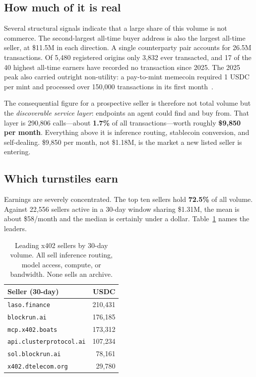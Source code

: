\documentclass[10pt,letterpaper,twocolumn]{article}
\newcommand{\code}[1]{\texttt{#1}}
\begin{document}
\subsection{How much of it is real}

Several structural signals indicate that a large share of this volume is not
commerce. The second-largest all-time buyer address is also the largest
all-time seller, at \$11.5M in each direction. A single counterparty pair
accounts for 26.5M transactions. Of 5{,}480 registered origins only 3{,}832
ever transacted, and 17 of the 40 highest all-time earners have recorded no
transaction since 2025. The 2025 peak also carried outright non-utility: a
pay-to-mint memecoin required 1 USDC per mint and processed over 150{,}000
transactions in its first month~\citep{chainalysis2026}.

The consequential figure for a prospective seller is therefore not total
volume but the \emph{discoverable service layer}: endpoints an agent could
find and buy from. That layer is 290{,}806 calls---about \textbf{1.7\%} of all
transactions---worth roughly \textbf{\$9{,}850 per month}. Everything above it
is inference routing, stablecoin conversion, and self-dealing. \$9{,}850 per
month, not \$1.18M, is the market a new listed seller is entering.

\subsection{Which turnstiles earn}

Earnings are severely concentrated. The top ten sellers hold \textbf{72.5\%}
of all volume. Against 22{,}556 sellers active in a 30-day window sharing
\$1.31M, the mean is about \$58/month and the median is certainly under a
dollar. Table~\ref{tab:sellers} names the leaders.

\begin{table}[t]
\centering
\footnotesize
\begin{tabularx}{\columnwidth}{@{}Xr@{}}
\toprule
\textbf{Seller (30-day)} & \textbf{USDC} \\
\midrule
\code{laso.finance} & 210{,}431 \\
\code{blockrun.ai} & 176{,}185 \\
\code{mcp.x402.boats} & 173{,}312 \\
\code{api.clusterprotocol.ai} & 107{,}234 \\
\code{sol.blockrun.ai} & 78{,}161 \\
\code{x402.dtelecom.org} & 29{,}780 \\
\bottomrule
\end{tabularx}
\caption{Leading x402 sellers by 30-day volume. All sell inference routing,
model access, compute, or bandwidth. None sells an archive.}
\label{tab:sellers}
\end{table}
\end{document}
